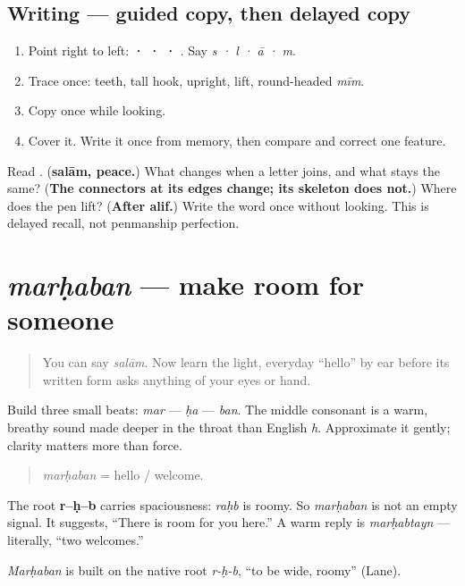 \subsection*{Writing — guided copy, then delayed copy}
\begin{enumerate}
\raggedright
  \item Point right to left: \textbf{ ·  ·  · }. Say \emph{s · l · ā · m}.
  \item Trace \textbf{} once: teeth, tall hook, upright, lift, round-headed \emph{mīm}.
  \item Copy \textbf{} once while looking.
  \item Cover it. Write it once from memory, then compare and correct one feature.
\end{enumerate}

\begin{tcolorbox}[breakable,colback=teal!4,colframe=teal!35!black,title={Before you move on}]
Read \textbf{}. (\textbf{salām, peace.}) What changes when a letter joins, and what stays the same? (\textbf{The connectors at its edges change; its skeleton does not.}) Where does the pen lift? (\textbf{After alif.}) Write the word once without looking. This is delayed recall, not penmanship perfection.
\end{tcolorbox}
\section[marḥaban]{\emph{marḥaban} — make room for someone}

\label{lesson:AR-C01-marhaba}



\begin{quote}
You can say \emph{salām}. Now learn the light, everyday “hello” by ear before its written form asks anything of your eyes or hand.
\end{quote}

\begin{sounds}
Build three small beats: \emph{mar} — \emph{ḥa} — \emph{ban}. The middle consonant is a warm, breathy sound made deeper in the throat than English \emph{h}. Approximate it gently; clarity matters more than force.

\begin{quote}
\emph{marḥaban} = hello / welcome.
\end{quote}
\end{sounds}

\begin{cousinweb}
The root \textbf{r–ḥ–b} carries spaciousness: \emph{raḥb} is roomy. So \emph{marḥaban} is not an empty signal. It suggests, “There is room for you here.” A warm reply is \emph{marḥabtayn} — literally, “two welcomes.”

\emph{Marḥaban} is built on the native root \emph{r-ḥ-b}, \textquotedblleft{}to be wide, roomy\textquotedblright{} (Lane).
\end{cousinweb}

